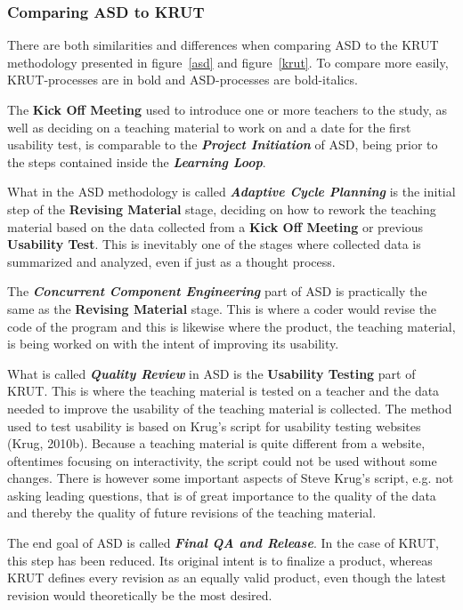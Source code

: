 \subsubsection*{Comparing ASD to KRUT} 
There are both similarities and differences when comparing ASD to the KRUT methodology presented in figure~\ref{asd} and figure~\ref{krut}. To compare more easily, KRUT-processes are in bold and ASD-processes are bold-italics. 

The \textbf{Kick Off Meeting} used to introduce one or more teachers to the study, as well as deciding on a teaching material to work on and a date for the first usability test, is comparable to the \textbf{\textit{Project Initiation}} of ASD, being prior to the steps contained inside the \textbf{\textit{Learning Loop}}.

What in the ASD methodology is called \textbf{\textit{Adaptive Cycle Planning}} is the initial step of the \textbf{Revising Material} stage, deciding on how to rework the teaching material based on the data collected from a \textbf{Kick Off Meeting} or previous \textbf{Usability Test}. This is inevitably one of the stages where collected data is summarized and analyzed, even if just as a thought process.

The \textbf{\textit{Concurrent Component Engineering}} part of ASD is practically the same as the \textbf{Revising Material} stage. This is where a coder would revise the code of the program and this is likewise where the product, the teaching material, is being worked on with the intent of improving its usability.

What is called \textbf{\textit{Quality Review}} in ASD is the \textbf{Usability Testing} part of KRUT. This is where the teaching material is tested on a teacher and the data needed to improve the usability of the teaching material is collected. The method used to test usability is based on Krug’s script for usability testing websites (Krug, 2010b). Because a teaching material is quite different from a website, oftentimes focusing on interactivity, the script could not be used without some changes. There is however some important aspects of Steve Krug’s script, e.g. not asking leading questions, that is of great importance to the quality of the data and thereby the quality of future revisions of the teaching material.

The end goal of ASD is called \textbf{\textit{Final QA and Release}}. In the case of KRUT, this step has been reduced. Its original intent is to finalize a product, whereas KRUT defines every revision as an equally valid product, even though the latest revision would theoretically be the most desired.

